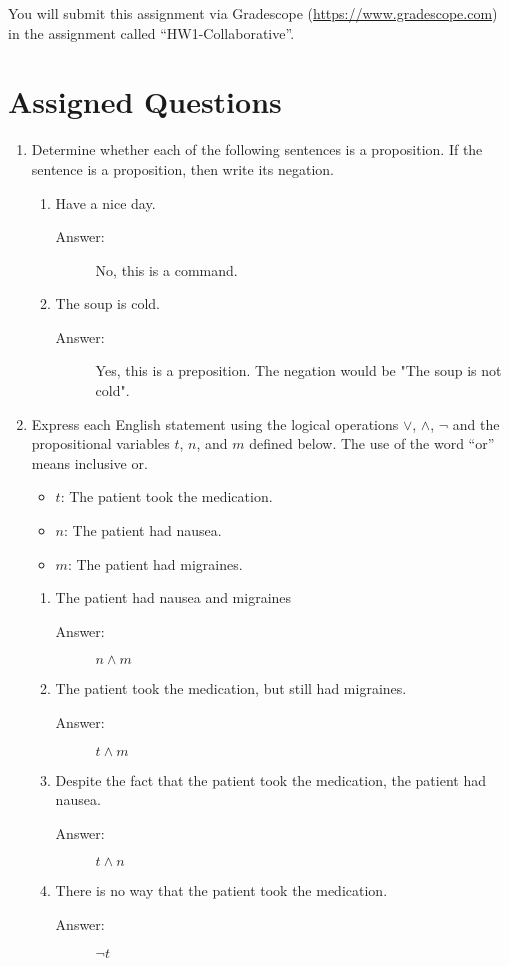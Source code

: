 \documentclass[12pt, oneside]{article}
\begin{document}
You will submit this assignment via Gradescope
(\href{https://www.gradescope.com}{https://www.gradescope.com}) in the assignment called ``HW1-Collaborative''.

\section*{Assigned Questions}
\begin{enumerate}
\item Determine whether each of the following sentences is a proposition. If the sentence is a proposition, then write its negation.
\begin{enumerate}
    \item Have a nice day.
    \begin{description}
        \item[Answer:] No, this is a command.
    \end{description}
    \item The soup is cold.
    \begin{description}
        \item[Answer:] Yes, this is a preposition. The negation would be "The soup is not cold".
    \end{description}
\end{enumerate}
\item Express each English statement using the logical operations $\lor$, $\land$, $\neg$ and the propositional variables $t$, $n$, and $m$ defined below. The use of the word ``or'' means inclusive or.
\begin{itemize}
    \item $t$: The patient took the medication.
    \item $n$: The patient had nausea.
    \item $m$: The patient had migraines.
\end{itemize}

\begin{enumerate}
    \item The patient had nausea and migraines
    \begin{description}
        \item[Answer:] $n \wedge m$
    \end{description}
    \item The patient took the medication, but still had migraines.
    \begin{description}
        \item[Answer:] $t \wedge m$
    \end{description}
    \item Despite the fact that the patient took the medication, the patient had nausea.
    \begin{description}
        \item[Answer:] $t \wedge n$
    \end{description}
    \item There is no way that the patient took the medication.
    \begin{description}
        \item[Answer:] $\lnot t$
    \end{description}
\end{enumerate}



\end{enumerate}
\end{document}
